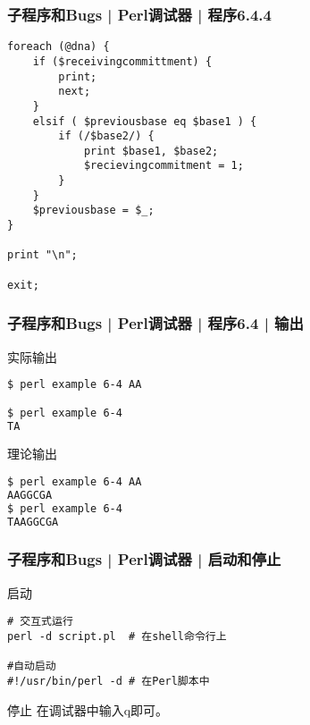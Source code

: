 \begin{frame}[fragile]
  \frametitle{子程序和Bugs | Perl调试器 | 程序6.4.4}
\begin{lstlisting}[firstnumber=40,basicstyle=\small\tt]
foreach (@dna) {
    if ($receivingcommittment) {
        print;
        next;
    }
    elsif ( $previousbase eq $base1 ) {
        if (/$base2/) {
            print $base1, $base2;
            $recievingcommitment = 1;
        }
    }
    $previousbase = $_;
}

print "\n";

exit;
\end{lstlisting}
\end{frame}

\begin{frame}[fragile]
  \frametitle{子程序和Bugs | Perl调试器 | 程序6.4 | 输出}
  \begin{block}{实际输出}
\begin{lstlisting}[language=sh]
$ perl example 6-4 AA

$ perl example 6-4
TA
\end{lstlisting}
  \end{block}
  \pause
  \begin{block}{理论输出}
\begin{lstlisting}[language=sh]
$ perl example 6-4 AA
AAGGCGA
$ perl example 6-4
TAAGGCGA
\end{lstlisting}
  \end{block}
\end{frame}

\begin{frame}[fragile]
  \frametitle{子程序和Bugs | Perl调试器 | \alert{启动和停止}}
  \begin{block}{启动}
\begin{lstlisting}
# 交互式运行
perl -d script.pl  # 在shell命令行上

#自动启动
#!/usr/bin/perl -d # 在Perl脚本中
\end{lstlisting}
  \end{block}
  \pause
  \begin{block}{停止}
    在调试器中输入q即可。
  \end{block}
\end{frame}

